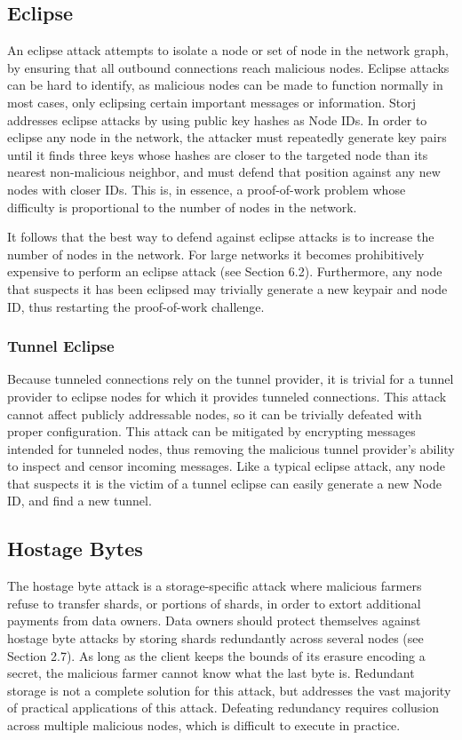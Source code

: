 \documentclass[a4paper,10pt]{article}
\begin{document}
\subsection{Eclipse}
An eclipse attack attempts to isolate a node or set of node in the network graph, by ensuring that all outbound connections reach malicious nodes. Eclipse attacks can be hard to identify, as malicious nodes can be made to function normally in most cases, only eclipsing certain important messages or information. Storj addresses eclipse attacks by using public key hashes as Node IDs. In order to eclipse any node in the network, the attacker must repeatedly generate key pairs until it finds three keys whose hashes are closer to the targeted node than its nearest non-malicious neighbor, and must defend that position against any new nodes with closer IDs. This is, in essence, a proof-of-work problem whose difficulty is proportional to the number of nodes in the network.

It follows that the best way to defend against eclipse attacks is to increase the number of nodes in the network. For large networks it becomes prohibitively expensive to perform an eclipse attack (see Section 6.2). Furthermore, any node that suspects it has been eclipsed may trivially generate a new keypair and node ID, thus restarting the proof-of-work challenge.

\subsubsection{Tunnel Eclipse}
Because tunneled connections rely on the tunnel provider, it is trivial for a tunnel provider to eclipse nodes for which it provides tunneled connections. This attack cannot affect publicly addressable nodes, so it can be trivially defeated with proper configuration. This attack can be mitigated by encrypting messages intended for tunneled nodes, thus removing the malicious tunnel provider's ability to inspect and censor incoming messages. Like a typical eclipse attack, any node that suspects it is the victim of a tunnel eclipse can easily generate a new Node ID, and find a new tunnel.

\subsection{Hostage Bytes}
The hostage byte attack is a storage-specific attack where malicious farmers refuse to transfer shards, or portions of shards, in order to extort additional payments from data owners. Data owners should protect themselves against hostage byte attacks by storing shards redundantly across several nodes (see Section 2.7). As long as the client keeps the bounds of its erasure encoding a secret, the malicious farmer cannot know what the last byte is. Redundant storage is not a complete solution for this attack, but addresses the vast majority of practical applications of this attack. Defeating redundancy requires collusion across multiple malicious nodes, which is difficult to execute in practice.
\end{document}
